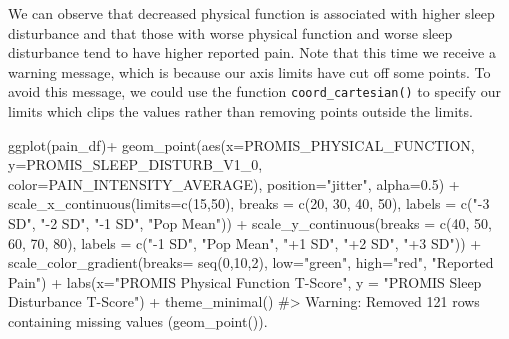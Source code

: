 \documentclass[
  letterpaper,
]{krantz}
\makeatletter
\newenvironment{Shaded}{\begin{snugshade}}{\end{snugshade}}
\newcommand{\AttributeTok}[1]{\textcolor[rgb]{0.40,0.45,0.13}{#1}}
\newcommand{\CommentTok}[1]{\textcolor[rgb]{0.37,0.37,0.37}{#1}}
\newcommand{\DecValTok}[1]{\textcolor[rgb]{0.68,0.00,0.00}{#1}}
\newcommand{\FloatTok}[1]{\textcolor[rgb]{0.68,0.00,0.00}{#1}}
\newcommand{\FunctionTok}[1]{\textcolor[rgb]{0.28,0.35,0.67}{#1}}
\newcommand{\NormalTok}[1]{\textcolor[rgb]{0.00,0.23,0.31}{#1}}
\newcommand{\SpecialCharTok}[1]{\textcolor[rgb]{0.37,0.37,0.37}{#1}}
\newcommand{\StringTok}[1]{\textcolor[rgb]{0.13,0.47,0.30}{#1}}
\newenvironment{kframe}{%
\medskip{}
\setlength{\fboxsep}{.8em}
 \def\at@end@of@kframe{}%
 \ifinner\ifhmode%
  \def\at@end@of@kframe{\end{minipage}}%
  \begin{minipage}{\columnwidth}%
 \fi\fi%
 \def\FrameCommand##1{\hskip\@totalleftmargin \hskip-\fboxsep
 \colorbox{shadecolor}{##1}\hskip-\fboxsep
     \hskip-\linewidth \hskip-\@totalleftmargin \hskip\columnwidth}%
 \MakeFramed {\advance\hsize-\width
   \@totalleftmargin\z@ \linewidth\hsize
   \@setminipage}}%
 {\par\unskip\endMakeFramed%
 \at@end@of@kframe}
\renewenvironment{Shaded}{\begin{kframe}}{\end{kframe}}
\makeatother
\begin{document}
We can observe that decreased physical function is associated with
higher sleep disturbance and that those with worse physical function and
worse sleep disturbance tend to have higher reported pain. Note that
this time we receive a warning message, which is because our axis limits
have cut off some points. To avoid this message, we could use the
function \texttt{coord\_cartesian()} to specify our limits which clips
the values rather than removing points outside the limits.

\begin{Shaded}
\begin{Highlighting}[]
\FunctionTok{ggplot}\NormalTok{(pain\_df)}\SpecialCharTok{+}
  \FunctionTok{geom\_point}\NormalTok{(}\FunctionTok{aes}\NormalTok{(}\AttributeTok{x=}\NormalTok{PROMIS\_PHYSICAL\_FUNCTION, }
                 \AttributeTok{y=}\NormalTok{PROMIS\_SLEEP\_DISTURB\_V1\_0, }
                 \AttributeTok{color=}\NormalTok{PAIN\_INTENSITY\_AVERAGE), }
             \AttributeTok{position=}\StringTok{"jitter"}\NormalTok{, }\AttributeTok{alpha=}\FloatTok{0.5}\NormalTok{) }\SpecialCharTok{+}
  \FunctionTok{scale\_x\_continuous}\NormalTok{(}\AttributeTok{limits=}\FunctionTok{c}\NormalTok{(}\DecValTok{15}\NormalTok{,}\DecValTok{50}\NormalTok{), }\AttributeTok{breaks =} \FunctionTok{c}\NormalTok{(}\DecValTok{20}\NormalTok{, }\DecValTok{30}\NormalTok{, }\DecValTok{40}\NormalTok{, }\DecValTok{50}\NormalTok{), }
                     \AttributeTok{labels =} \FunctionTok{c}\NormalTok{(}\StringTok{"{-}3 SD"}\NormalTok{, }\StringTok{"{-}2 SD"}\NormalTok{, }\StringTok{"{-}1 SD"}\NormalTok{, }
                                \StringTok{"Pop Mean"}\NormalTok{)) }\SpecialCharTok{+} 
  \FunctionTok{scale\_y\_continuous}\NormalTok{(}\AttributeTok{breaks =} \FunctionTok{c}\NormalTok{(}\DecValTok{40}\NormalTok{, }\DecValTok{50}\NormalTok{, }\DecValTok{60}\NormalTok{, }\DecValTok{70}\NormalTok{, }\DecValTok{80}\NormalTok{), }
                     \AttributeTok{labels =} \FunctionTok{c}\NormalTok{(}\StringTok{"{-}1 SD"}\NormalTok{, }\StringTok{"Pop Mean"}\NormalTok{, }\StringTok{"+1 SD"}\NormalTok{, }\StringTok{"+2 SD"}\NormalTok{, }
                                \StringTok{"+3 SD"}\NormalTok{)) }\SpecialCharTok{+}
  \FunctionTok{scale\_color\_gradient}\NormalTok{(}\AttributeTok{breaks=} \FunctionTok{seq}\NormalTok{(}\DecValTok{0}\NormalTok{,}\DecValTok{10}\NormalTok{,}\DecValTok{2}\NormalTok{), }\AttributeTok{low=}\StringTok{"green"}\NormalTok{, }\AttributeTok{high=}\StringTok{"red"}\NormalTok{, }
                       \StringTok{"Reported Pain"}\NormalTok{) }\SpecialCharTok{+}
  \FunctionTok{labs}\NormalTok{(}\AttributeTok{x=}\StringTok{"PROMIS Physical Function T{-}Score"}\NormalTok{, }
       \AttributeTok{y =} \StringTok{"PROMIS Sleep Disturbance T{-}Score"}\NormalTok{) }\SpecialCharTok{+} 
  \FunctionTok{theme\_minimal}\NormalTok{()}
\CommentTok{\#\textgreater{} Warning: Removed 121 rows containing missing values (\textasciigrave{}geom\_point()\textasciigrave{}).}
\end{Highlighting}
\end{Shaded}
\end{document}
